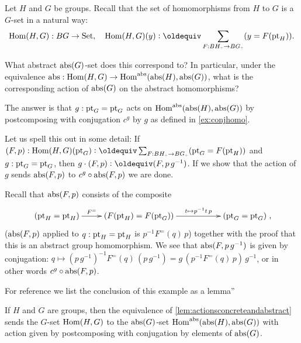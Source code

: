 {\begin{example}
  \label{ex:abstrandconj}
  Let $H$ and $G$ be groups.  Recall that the set of homomorphisms from $H$ to $G$ is a $G$-set in a natural way:
$$\Hom(H,G):BG\to\Set,\quad \Hom(H,G)(y)\defequi \sum_{F:BH_\div\to BG_\div}(y=F(\pt_H)).$$

What abstract $\mathrm{abs}(G)$-set does this correspond to?
In particular, under the equivalence $\mathrm{abs}:\mathrm{Hom}(H,G)\to\mathrm{Hom}^{\mathrm{abs}}(\mathrm{abs}(H),\mathrm{abs}(G))$, what is the corresponding action of $\mathrm{abs}(G)$ on the abstract homomorphisms?

The answer is that $g:\mathrm{pt}_G=\mathrm{pt}_G$ acts on $\mathrm{Hom}^{\mathrm{abs}}(\mathrm{abs}(H),\mathrm{abs}(G))$ by postcomposing with conjugation $c^g$ by $g$ as defined in \cref{ex:conjhomo}.  

Let us spell this out in some detail:
If $(F,p):\Hom(H,G)(\pt_G)\defequi
 \sum_{F:BH_\div\to BG_\div}(\pt_G=F(\pt_H))$ and $g:\mathrm{pt}_G=\mathrm{pt}_G$, then $g\cdot(F,p)\defequi(F,p\,g^{-1})$.  If we show that the action of $g$ sends $\mathrm{abs}(F,p)$ to $c^g\circ\mathrm{abs}(F,p)$ we are done.

Recall that $\mathrm{abs}(F,p)$ consists of the composite 
$$\xymatrix{(\pt_H=\pt_H)\ar[r]^-{F^=}&(F(\pt_H)=F(\pt_G))\ar[rr]^-{t\mapsto p^{-1}t\,p}&&(\pt_G=\pt_G)},$$ 
(\ie $\mathrm{abs}(F,p)$ applied to $q:\mathrm{pt}_H=\mathrm{pt}_H $ is  $p^{-1}F^=(q)\,p$)  together with the proof that this is an abstract group homomorphism.  
We see that $\mathrm{abs}(F,p\,g^{-1})$ is given by conjugation:
$q\mapsto(p\,g^{-1})^{-1}F^=(q)\,(p\,g^{-1})=g\,(p^{-1}F^=(q)\,p)\,g^{-1}$, or in other words $c^g\circ\mathrm{abs}(F,p)$.
\end{example}
For reference we list the conclusion of this example as a lemma''
\begin{lemma}\label{lem:abstrandconj}
  If $H$ and $G$ are groups, then the equivalence of \cref{lem:actionsconcreteandabstract} sends the $G$-set $\mathrm{Hom}(H,G)$ to the $\mathrm{abs}(G)$-set $\mathrm{Hom}^{\mathrm{abs}}(\mathrm{abs}(H),\mathrm{abs}(G))$ with action given by postcomposing with conjugation by elements of $\mathrm{abs}(G)$.
\end{lemma}

}
